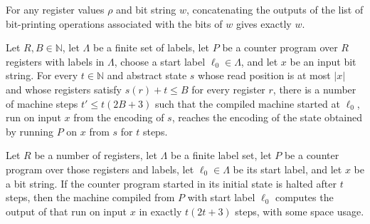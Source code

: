 \begin{theorem}
\label{Complexity.CounterProg.flatMap_exec_bitsOps}
\leanok
{}
For any register values $\rho$ and bit string $w$, concatenating the outputs of the list
of bit-printing operations associated with the bits of $w$ gives exactly $w$.
\end{theorem}

\begin{theorem}
\label{Complexity.CounterProg.sim_run}
\leanok
{}
Let $R,B\in\mathbb{N}$, let $\Lambda$ be a finite set of labels, let $P$ be a counter
program over $R$ registers with labels in $\Lambda$, choose a start label
$\ell_0\in\Lambda$, and let $x$ be an input bit string. For every $t\in\mathbb{N}$ and
abstract state $s$ whose read position is at most $|x|$ and whose registers satisfy
$s(r)+t\le B$ for every register $r$, there is a number of machine steps $t'\le t(2B+3)$
such that the compiled machine started at $\ell_0$, run on input $x$ from the encoding
of $s$, reaches the encoding of the state obtained by running $P$ on $x$ from $s$ for
$t$ steps.
\end{theorem}

\begin{theorem}
\label{Complexity.CounterProg.exists_tm}
\leanok
{}
Let $R$ be a number of registers, let $\Lambda$ be a finite label set, let $P$ be a
counter program over those registers and labels, let $\ell_0\in\Lambda$ be its start
label, and let $x$ be a bit string. If the counter program started in its initial state
is halted after $t$ steps, then the machine compiled from $P$ with start label $\ell_0$
computes the output of that run on input $x$ in exactly $t(2t+3)$ steps, with some space
usage.
\end{theorem}

